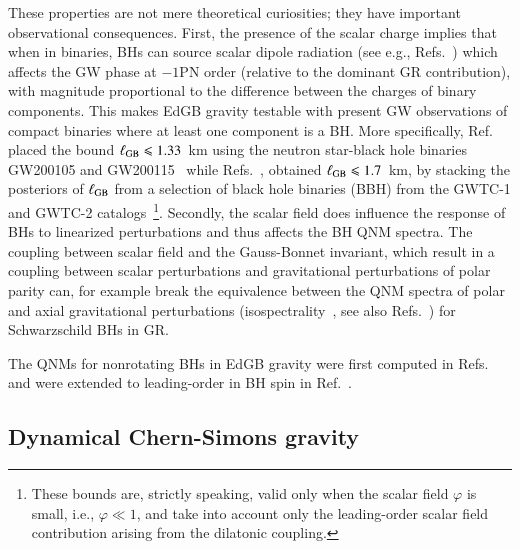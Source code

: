 \documentclass[twocolumn,
               prd,
               aps,
               superscriptaddress,
               tightenlines,
               nofootinbib,
               eqsecnum,
               amsfonts,
               amsmath,
               longbibliography]{revtex4-1}
\begin{document}
These properties are not mere theoretical curiosities; they have important observational consequences.
%
First, the presence of the scalar charge implies that when in binaries, BHs can source
scalar dipole radiation (see e.g., Refs.~\cite{Yagi:2011xp,Julie:2019sab,Shiralilou:2020gah,Shiralilou:2021mfl,Julie:2022huo})
which affects the GW phase at $-1$PN order (relative to the dominant GR
contribution), with magnitude proportional to the difference between the
charges of binary components. This makes EdGB gravity testable with present GW
observations of compact binaries where at least one component is a BH.
%
More specifically, Ref.~\cite{Lyu:2022gdr} placed the bound
%
$\ell_{\rm GB} \leqslant 1.33$~km
%
using the neutron star-black hole binaries GW200105 and
GW200115~\cite{LIGOScientific:2021qlt} while Refs.~\cite{Nair:2019iur,Perkins:2021mhb}, obtained
%
$\ell_{\rm GB} \leqslant 1.7$~km,
%
by stacking the posteriors of $\ell_{\rm GB}$ from a selection of black hole binaries (BBH)
from the GWTC-1 and GWTC-2 catalogs~\cite{LIGOScientific:2018mvr,LIGOScientific:2020ibl}\footnote{These bounds
are, strictly speaking, valid only when the scalar field $\varphi$ is small, i.e., $\varphi \ll 1$, and
take into account only the leading-order scalar field contribution arising from the dilatonic coupling.}.
Secondly, the scalar field does influence the response of BHs to linearized perturbations and thus
affects the BH QNM spectra.
%
The coupling between scalar field and the Gauss-Bonnet invariant, which
result in a coupling between scalar perturbations and gravitational
perturbations of polar parity can, for example break the equivalence
between the QNM spectra of polar and axial gravitational perturbations
(isospectrality~\cite{Chandrasekhar:1985kt}, see also Refs.~\cite{Glampedakis:2017rar,Lenzi:2021njy}) for Schwarzschild BHs in GR.
%

The QNMs for nonrotating BHs in EdGB gravity were first computed in
Refs.~\cite{Pani:2009wy,Blazquez-Salcedo:2016enn} and were
extended to leading-order in BH spin in Ref.~\cite{Pierini:2021jxd}.

\subsection{Dynamical Chern-Simons gravity}
\label{sec:review_dcs}
\end{document}
